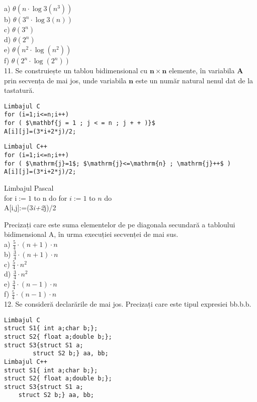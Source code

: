 a) $\theta\left(n \cdot \log 3\left(n^{3}\right)\right)$\\
b) $\theta\left(3^{n} \cdot \log 3(n)\right)$\\
c) $\theta\left(3^{n}\right)$\\
d) $\theta\left(2^{n}\right)$\\
e) $\theta\left(n^{2} \cdot \log \left(n^{2}\right)\right)$\\
f) $\theta\left(2^{n} \cdot \log \left(2^{n}\right)\right)$\\
11. Se construiește un tablou bidimensional cu $\mathbf{n} \times \mathbf{n}$ elemente, în variabila $\mathbf{A}$ prin secvența de mai jos, unde variabila $\mathbf{n}$ este un număr natural nenul dat de la tastatură.

\begin{verbatim}
Limbajul C
for (i=1;i<=n;i++)
for ( $\mathbf{j = 1 ; j < = n ; j + + )}$
A[i][j]=(3*i+2*j)/2;
\end{verbatim}

\begin{verbatim}
Limbajul C++
for (i=1;i<=n;i++)
for ( $\mathrm{j}=1$; $\mathrm{j}<=\mathrm{n} ; \mathrm{j}++$ )
A[i][j]=(3*i+2*j)/2;
\end{verbatim}

Limbajul Pascal\\
for $\mathrm{i}:=1$ to n do for $i:=1$ to $n$ do\\[0pt]
A[i,j]:=(3\textit{i+2}j)/2

Precizați care este suma elementelor de pe diagonala secundară a tabloului bidimensional A, în urma execuției secvenței de mai sus.\\
a) $\frac{5}{4} \cdot(n+1) \cdot n$\\
b) $\frac{3}{4} \cdot(n+1) \cdot n$\\
c) $\frac{5}{4} \cdot n^{2}$\\
d) $\frac{3}{4} \cdot n^{2}$\\
e) $\frac{3}{4} \cdot(n-1) \cdot n$\\
f) $\frac{5}{4} \cdot(n-1) \cdot n$\\
12. Se consideră declarările de mai jos. Precizați care este tipul expresiei bb.b.b.

\begin{verbatim}
Limbajul C
struct S1{ int a;char b;};
struct S2{ float a;double b;};
struct S3{struct S1 a;
        struct S2 b;} aa, bb;
Limbajul C++
struct S1{ int a;char b;};
struct S2{ float a;double b;};
struct S3{struct S1 a;
    struct S2 b;} aa, bb;
\end{verbatim}

